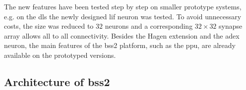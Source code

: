 The new features have been tested step by step on smaller prototype systems, e.g. on the \gls{dls} the newly designed \gls{lif} neuron was tested. To avoid unnecessary costs, the size was reduced to $32$ neurons and a corresponding $32 \times 32$ synapse array allows all to all connectivity. Besides the Hagen extension and the \gls{adex} neuron, the main features of the \gls{bss2} platform, such as the \gls{ppu}, are already available on the prototyped versions.



\subsection{Architecture of \gls{bss2}}

